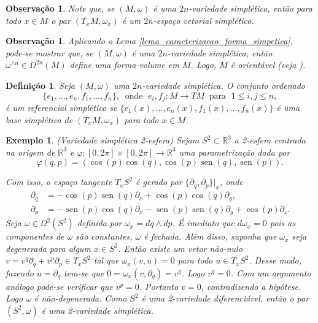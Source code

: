 \documentclass[12pt]{book}
\newtheorem{definicao}[teorema]{Definição}
\newtheorem{exemplo}[teorema]{Exemplo}
\newtheorem{observacao}[teorema]{Observação}
\DeclareMathOperator{\sen}{sen}
\newcommand{\derivadaparcialabrev}[1]{\partial_{#1}}
\newcommand{\espacotangenteponto}[2]{T_{#1}#2}
\newcommand{\real}[1]{\mathbb{R}^{#1}}
\begin{document}
	\begin{observacao}
		Note que, se $(M, \omega)$ é uma $2n$-variedade simplética, então para todo $x \in M$ o par $(T_{x}M, \omega_{x})$ é um $2n$-espaço vetorial simplético.
	\end{observacao}
	
	\begin{observacao}
		Aplicando o Lema \ref{lema_caracterizacao_forma_simpetica}, pode-se mostrar que, se $(M, \omega)$ é uma $2n$-variedade simplética, então $\omega^{\wedge n} \in \Omega^{2n}(M)$ define uma forma-volume em $M$. Logo, $M$ é orientável (veja \cite{warner_manifolds}).
	\end{observacao}
	
	\begin{definicao}Seja $(M, \omega)$ uma $2n$-variedade simplética.
		O conjunto ordenado 
		$$
		\{e_{1}, \dots, e_{n}, f_{1},\dots , f_{n}\}, \;\;\text{onde }\; e_{i}, f_{j}:M\to TM
		\;\; \text{para }\;1\leq i,j\leq n,
		$$
		é um referencial simplético se $\{e_{1}(x), \dots, e_{n}(x), f_{1}(x),\dots , f_{n}(x)\}$ é uma base simplética de $(\espacotangenteponto{x}{M},\omega_{x})$ para todo $x\in M$.
	\end{definicao}
	
	\begin{exemplo}\label{exemplo_variedade_simpletica_esfera}
		(Variedade simplética 2-esfera) Sejam $S^{2} \subset \real{3}$ a 2-esfera centrada na origem de $\real{3}$ e $\varphi:[0,2\pi]\times [0,2\pi] \to \real{3}$ uma parametrização dada por 
		$$
		\varphi(q, p) = (\cos (p) \cos (q), \cos (p) \sen (q), \sen (p)).
		$$
		
		Com isso, o espaço tangente $T_{x}S^{2} $ é gerado por $ \{\derivadaparcialabrev{ q}, \derivadaparcialabrev{ p} \}|_{x}$, onde
		$$
		\begin{aligned}
		\derivadaparcialabrev{ q} &= -\cos (p)\sen (q) \derivadaparcialabrev{x}+ \cos (p)\cos (q) \derivadaparcialabrev{y},
		\\
		\derivadaparcialabrev{ p} &=  - \sen (p) \cos (q) 	\derivadaparcialabrev{x} - \sen (p) \sen (q) 	\derivadaparcialabrev{y} +\cos (p)				\derivadaparcialabrev{z}.
		\end{aligned} 
		$$
		Seja $\omega\in \Omega^{2}(S^{2})$ definida por $\omega_{x} = dq \wedge dp$. É imediato que $d\omega_{x} = 0$ pois as componentes de $\omega$ são constantes, $\omega$ é fechada. Além disso, suponha que $\omega_{x}$ seja degenerada para algum $x \in S^{2}$. Então existe um vetor não-nulo $v = v^{q}\partial_{q}+v^{p}\partial_{p} \in T_{x}S^{2}$ tal que $\omega_{x}(v, u)=0$ para todo $u\in T_{x}S^{2}$. Desse modo, fazendo $u = \partial_{q}$ tem-se que $0=\omega_{x}(v, \partial_{q}) = v^{q}$. Logo $v^{q}=0$. Com um argumento análogo pode-se verificar que $v^{p}=0$. Portanto $v=0$, contradizendo a hipótese. Logo $\omega$ é não-degenerada. Como $S^{2}$ é uma 2-variedade diferenciável, então o par $(S^{2}, \omega)$ é uma 2-variedade simplética.
	\end{exemplo}
	
\end{document}
